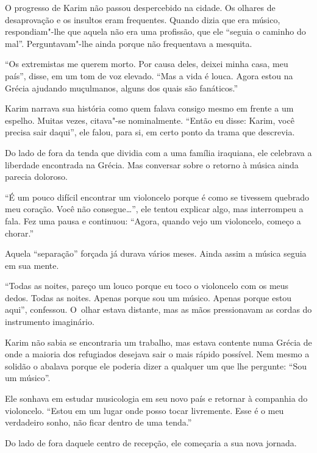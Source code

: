 O progresso de Karim não passou despercebido na cidade. Os olhares de
desaprovação e os insultos eram frequentes. Quando dizia que era músico,
respondiam"-lhe que aquela não era uma profissão, que ele ``seguia o
caminho do mal''. Perguntavam"-lhe ainda porque não frequentava a
mesquita.

``Os extremistas me querem morto. Por causa deles, deixei minha casa,
meu país'', disse, em um tom de voz elevado. ``Mas a vida é louca. Agora
estou na Grécia ajudando muçulmanos, alguns dos quais são fanáticos.''

Karim narrava sua história como quem falava consigo mesmo em frente a um
espelho. Muitas vezes, citava"-se nominalmente. ``Então eu disse: Karim,
você precisa sair daqui'', ele falou, para si, em certo ponto da trama
que descrevia.

Do lado de fora da tenda que dividia com a uma família iraquiana, ele
celebrava a liberdade encontrada na Grécia. Mas conversar sobre o retorno à
música ainda parecia doloroso.

``É um pouco difícil encontrar um violoncelo porque é como se tivessem
quebrado meu coração. Você não consegue…'', ele tentou explicar
algo, mas interrompeu a fala. Fez uma pausa e continuou: ``Agora, quando
vejo um violoncelo, começo a chorar.''

Aquela ``separação'' forçada já durava vários meses. Ainda assim a
música seguia em sua mente.

``Todas as noites, pareço um louco porque eu toco o violoncelo com os
meus dedos. Todas as noites. Apenas porque sou um músico. Apenas porque
estou aqui'', confessou. O~olhar estava distante, mas as mãos
pressionavam as cordas do instrumento imaginário.

Karim não sabia se encontraria um trabalho, mas estava contente numa
Grécia de onde a maioria dos refugiados desejava sair o mais rápido
possível. Nem mesmo a solidão o abalava porque ele poderia dizer a
qualquer um que lhe pergunte: ``Sou um músico''.

Ele sonhava em estudar musicologia em seu novo país e retornar à
companhia do violoncelo. ``Estou em um lugar onde posso tocar
livremente. Esse é o meu verdadeiro sonho, não ficar dentro de uma
tenda.'' 

Do lado de fora daquele centro de recepção, ele começaria a sua nova
jornada.


